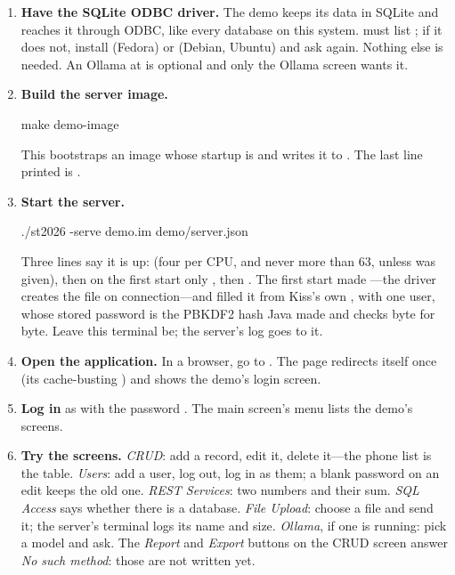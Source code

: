 \begin{enumerate}
\item \textbf{Have the SQLite ODBC driver.} The demo keeps its data in
  SQLite and reaches it through ODBC, like every database on this system.
   must list \ct{[SQLITE3]}; if it does not, install
   (Fedora) or  (Debian, Ubuntu) and ask
  again. Nothing else is needed. An Ollama at  is
  optional and only the Ollama screen wants it.

\item \textbf{Build the server image.}
\begin{plain}
make demo-image
\end{plain}
  This bootstraps an image whose startup is  and
  writes it to . The last line printed is
  .

\item \textbf{Start the server.}
\begin{plain}
./st2026 -serve demo.im demo/server.json
\end{plain}
  Three lines say it is up:  (four
  per CPU, and never more than 63, unless  was given), then
  on the first start only
  , then
  . The first start made
  ---the driver creates the file on connection---and
   filled it from Kiss's own ,
  with one user, whose stored password is the PBKDF2 hash Java made and
   checks byte for byte. Leave this terminal be; the
  server's log goes to it.

\item \textbf{Open the application.} In a browser, go to
  . The page redirects itself once (its
  cache-busting ) and shows the demo's login screen.

\item \textbf{Log in} as  with the password . The
  main screen's menu lists the demo's screens.

\item \textbf{Try the screens.} \emph{CRUD}: add a record, edit it,
  delete it---the phone list is the  table. \emph{Users}: add a
  user, log out, log in as them; a blank password on an edit keeps the old
  one. \emph{REST Services}: two numbers and their sum. \emph{SQL Access}
  says whether there is a database.
  \emph{File Upload}: choose a file and send it; the server's terminal logs
  its name and size. \emph{Ollama}, if one is running: pick a model and
  ask. The \emph{Report} and \emph{Export} buttons on the CRUD screen
  answer \emph{No such method}: those are not written yet.


\end{enumerate}
